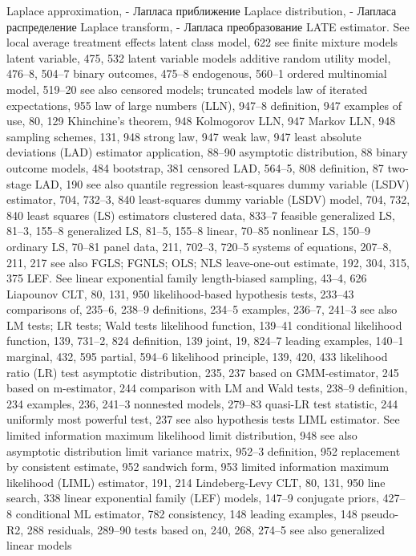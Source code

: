 Laplace approximation, - Лапласа приближение
Laplace distribution, - Лапласа распределение
Laplace transform, - Лапласа преобразование
LATE estimator. See local average treatment effects latent class model, 622
see finite mixture models latent variable, 475, 532 latent variable models
additive random utility model, 476–8, 504–7 binary outcomes, 475–8
endogenous, 560–1
ordered multinomial model, 519–20
see also censored models; truncated models law of iterated expectations, 955
law of large numbers (LLN), 947–8
definition, 947
examples of use, 80, 129 Khinchine’s theorem, 948 Kolmogorov LLN, 947 Markov LLN, 948
sampling schemes, 131, 948 strong law, 947
weak law, 947
least absolute deviations (LAD) estimator application, 88–90
asymptotic distribution, 88
binary outcome models, 484
bootstrap, 381
censored LAD, 564–5, 808 definition, 87
two-stage LAD, 190
see also quantile regression
least-squares dummy variable (LSDV) estimator, 704, 732–3, 840
least-squares dummy variable (LSDV) model, 704, 732, 840
least squares (LS) estimators
clustered data, 833–7
feasible generalized LS, 81–3, 155–8 generalized LS, 81–5, 155–8
linear, 70–85
nonlinear LS, 150–9
ordinary LS, 70–81
panel data, 211, 702–3, 720–5
systems of equations, 207–8, 211, 217
see also FGLS; FGNLS; OLS; NLS leave-one-out estimate, 192, 304, 315, 375 LEF. See linear exponential family length-biased sampling, 43–4, 626 Liapounov CLT, 80, 131, 950 likelihood-based hypothesis tests, 233–43
comparisons of, 235–6, 238–9 definitions, 234–5
examples, 236–7, 241–3
see also LM tests; LR tests; Wald tests
likelihood function, 139–41
conditional likelihood function, 139, 731–2, 824 definition, 139
joint, 19, 824–7
leading examples, 140–1
marginal, 432, 595
partial, 594–6
likelihood principle, 139, 420, 433 likelihood ratio (LR) test
asymptotic distribution, 235, 237
based on GMM-estimator, 245
based on m-estimator, 244
comparison with LM and Wald tests, 238–9 definition, 234
examples, 236, 241–3
nonnested models, 279–83 quasi-LR test statistic, 244 uniformly most powerful test, 237 see also hypothesis tests
LIML estimator. See limited information maximum likelihood
limit distribution, 948
see also asymptotic distribution
limit variance matrix, 952–3
definition, 952
replacement by consistent estimate, 952 sandwich form, 953
limited information maximum likelihood (LIML) estimator, 191, 214
Lindeberg-Levy CLT, 80, 131, 950
line search, 338
linear exponential family (LEF) models, 147–9
conjugate priors, 427–8 conditional ML estimator, 782 consistency, 148
leading examples, 148 pseudo-R2, 288
residuals, 289–90
tests based on, 240, 268, 274–5 see also generalized linear models
